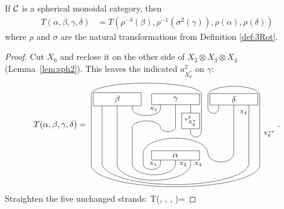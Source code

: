 \documentclass{amsart}
\begin{document}
\begin{proposition} \label{prop:rel2}
If $\mC$ is a spherical monoidal category, then
\begin{align*}
T(\alpha, \beta, \gamma, \delta)
& = T(\rho^{-3}(\beta), \rho^{-1}(\sigma^{2}(\gamma)), \rho(\alpha), \rho(\delta)) %
\end{align*}
where $\rho$ and $\sigma$ are the natural transformations from Definition \ref{def:3Rot}.
\end{proposition}
\begin{proof}
Cut $X_6$ and reclose it on the other side of $X_2\otimes X_3\otimes X_4$
(Lemma~\ref{lem:sph2}). This leaves the indicated $a_{X_6^*}^2$ on $\gamma$:
$$T(\alpha, \beta, \gamma, \delta)=
\raisebox{-2.5cm}{
\begin{tikzpicture}[scale=.9]
\draw (-.7+0.6,0)--++(0,-.4) node [left=.015cm] {\tiny ${X_1}$} arc (0:-180:.4 and .25) --++(0,.5) arc (180:0:1.5 and .7) arc (-180:0:.6 and .4)  --++(0,2.5);
\draw (0+0.6,0)--++(0,-.4) node [right=.015cm] {\tiny ${X_2}$} arc (0:-180:1 and .5) --++(0,1.7) arc (180:0:.65 and .3) arc (-180:0:.35 and .2) --++(0,1.3);
\draw (.7+0.6,0)--++(0,-.4) node [right=.015cm] {\tiny ${X_3}$} arc (0:-180:1.7 and .75) --++(0,3);

\draw (-2.1-.7,2.6)--++(0,-.45) --++(0,-2.5) arc (-180:0:3.4 and 1);
\draw (-2.1+.7,2.6)--++(0,-.45) arc (-180:0:.65 and .3);

\draw (0.6-.7,2.6)--++(0,-.45) node [left] {\tiny ${X_5}$};
\draw (0.6+.7,2.6)--++(0,-1)  node [draw,fill=white] {\tiny $a^{2}_{X^*_6}$} --++(0,-.5) arc (-180:0:.25) --++ (0,.3) --++ (0,1.45) arc (0:180:2.55 and .5);

\draw (3.3-.7,2.6)--++(0,-.4) arc (0:-180:.25) --++ (0,.6) arc (180:0:1.2 and .4)  --++ (0,-1.25) --++ (0,-.55) node [right=.015cm] {\tiny ${X_6^{**}}$} --++ (0,-1.45) arc (0:-180:3.9 and 1) --++ (0,3.3);
\draw (3.3+.7,2.6)--++(0,-.60) node[left,inner sep=1.8pt] {\tiny $X_4$} --++(0,-2.35);

\draw (0.6,0) node [draw,fill=white,minimum width=2cm] {$\alpha$};
\draw (-2.1,2.6) node [draw,fill=white,minimum width=2cm] {$\beta$};
\draw (0.6,2.6) node [draw,fill=white,minimum width=2cm] {$\gamma$};
\draw (3.3,2.6) node [draw,fill=white,minimum width=2cm] {$\delta$};
\end{tikzpicture}}.
$$
Straighten the five unchanged strands:
$$T(\alpha, \beta, \gamma, \delta)=
\end{proof}
\end{document}
